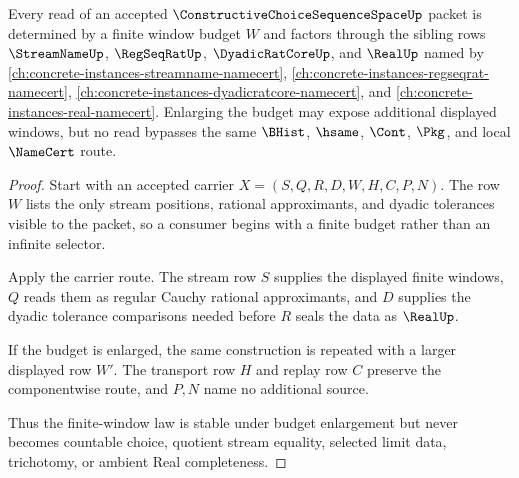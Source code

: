 \begin{theorem}
\label{thm:constructive-choice-sequence-space-finite-window-law}
Every read of an accepted $\ConstructiveChoiceSequenceSpaceUp$ packet is determined by a finite window budget $W$ and factors through the sibling rows $\StreamNameUp$, $\RegSeqRatUp$, $\DyadicRatCoreUp$, and $\RealUp$ named by \autoref{ch:concrete-instances-streamname-namecert}, \autoref{ch:concrete-instances-regseqrat-namecert}, \autoref{ch:concrete-instances-dyadicratcore-namecert}, and \autoref{ch:concrete-instances-real-namecert}. Enlarging the budget may expose additional displayed windows, but no read bypasses the same $\BHist$, $\hsame$, $\Cont$, $\Pkg$, and local $\NameCert$ route.
\end{theorem}
\begin{proof}
Start with an accepted carrier $X=(S,Q,R,D,W,H,C,P,N)$. The row $W$ lists the only stream positions, rational approximants, and dyadic tolerances visible to the packet, so a consumer begins with a finite budget rather than an infinite selector.

Apply the carrier route. The stream row $S$ supplies the displayed finite windows, $Q$ reads them as regular Cauchy rational approximants, and $D$ supplies the dyadic tolerance comparisons needed before $R$ seals the data as $\RealUp$.

If the budget is enlarged, the same construction is repeated with a larger displayed row $W'$. The transport row $H$ and replay row $C$ preserve the componentwise route, and $P,N$ name no additional source.

Thus the finite-window law is stable under budget enlargement but never becomes countable choice, quotient stream equality, selected limit data, trichotomy, or ambient Real completeness.
\end{proof}

\begin{closurestatus}{\ConstructiveChoiceSequenceSpaceUp}
  \theoryclosure{\seedClosure}
  \formalstatus{\unformalizedV}
\end{closurestatus}
